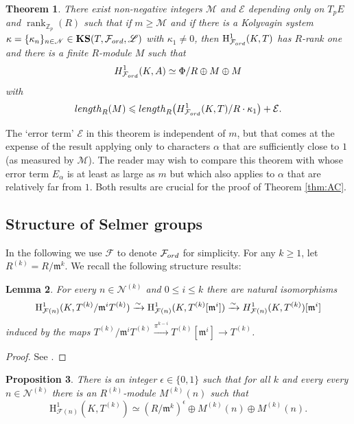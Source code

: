 \documentclass[a4paper,10pt]{amsart}
\numberwithin{equation}{section}
\numberwithin{equation}{section}
\theoremstyle{plain}
\newtheorem{thm}{Theorem}[subsection] %
\theoremstyle{definition}
\theoremstyle{definition}
\theoremstyle{plain}
\newtheorem{prop}[thm]{Proposition}
\theoremstyle{plain}
\newtheorem{lemma}[thm]{Lemma}
\theoremstyle{plain}
\theoremstyle{plain}
\newcommand{\Z}{\mathbb{Z}}
\newcommand{\CE}{\mathcal{E}}
\newcommand{\CM}{\mathcal{M}}
\newcommand{\CF}{\mathcal{F}}
\newcommand{\Fcal}{\mathcal{F}}
\newcommand{\cL}{\mathscr{L}}
\newcommand{\cN}{\mathscr{N}}
\newcommand{\fm}{\mathfrak{m}}
\newcommand{\rH}{\mathrm{H}}
\begin{document}
\begin{thm}\label{thm:Zp-twisted}  
There exist non-negative integers $\CM$ and $\CE$ depending only on $T_pE$ and $\operatorname{rank}_{\Z_p}(R)$ such that if
$m\geq \CM$ and if there is a Kolyvagin system $\kappa=\{\kappa_{n}\}_{n\in\cN}\in\mathbf{KS}(T,\Fcal_{\rm ord},\cL)$ with $\kappa_{1}\neq 0$,
then $\rH^1_{\Fcal_{\rm ord}}(K,T)$ has $R$-rank one and there is a finite $R$-module $M$ such that
\[
{\rm H}^1_{\Fcal_{\rm ord}}(K,A)\simeq \Phi/R \oplus M\oplus M
\]
with 
\[
{\rm length}_R(M)\leqslant {\rm length}_R\bigl({\rm H}^1_{\Fcal_{\rm ord}}(K,T)/R\cdot\kappa_{1}\bigr)+\CE.
\]
\end{thm}
\noindent The `error term' $\CE$ in this theorem is independent of $m$, but that comes at the expense of the result applying only to characters $\alpha$ that are sufficiently close to $1$ (as measured by $\CM$). The reader may wish to compare this theorem
with \cite[Thm.~3.2.1]{eisenstein} whose error term $E_\alpha$ is at least as large as $m$ but which also applies to $\alpha$ that are relatively far from $1$. Both results are crucial for the proof of Theorem \ref{thm:AC}.


\subsection{Structure of Selmer groups}

In the following we use $\Fcal$ to denote $\Fcal_{\rm ord}$ for simplicity. For any $k\geq 1$, let $R^{(k)}= R/\fm^k$.
We recall the following structure results:
\begin{lemma}%
\label{lemmamod} 
For every $n\in\cN^{(k)}$ and $0\leqslant i\leqslant k$ there are natural isomorphisms
\begin{equation}\label{eq2}
\rH^1_{\Fcal(n)}(K,T^{(k)}/\fm^iT^{(k)})\xrightarrow{\sim}\rH^1_{\Fcal(n)}(K,T^{(k)}[\fm^i])\xrightarrow{\sim}{\rm H}_{\Fcal(n)}^1(K,T^{(k)})[\fm^i]\nonumber
\end{equation}
induced by the maps $T^{(k)}/\fm^iT^{(k)}\xrightarrow{\pi^{k-i}}T^{(k)}[\fm^i]\rightarrow T^{(k)}$.
\end{lemma}

\begin{proof} See \cite[Lem.~3.3.1]{eisenstein}.
\end{proof}

\begin{prop}%
\label{propstructure} There is an integer $\epsilon\in\{0,1\}$ such that for all $k$ and every
every $n\in\cN^{(k)}$ there is an $R^{(k)}$-module $M^{(k)}(n)$ such that
\begin{equation}\label{eq1}
\rH^1_{\CF(n)}(K,T^{(k)}) \simeq (R/\fm^k)^\epsilon\oplus M^{(k)}(n)\oplus M^{(k)}(n).\nonumber
\end{equation}
\end{prop}
\end{document}
